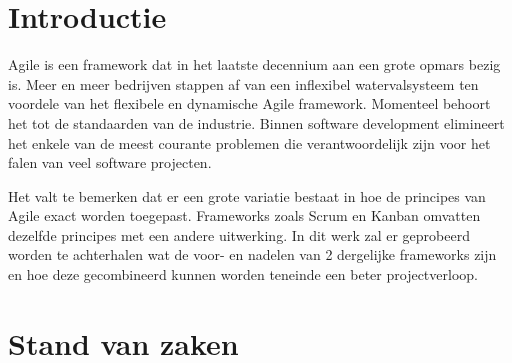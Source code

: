 
\section{Introductie} %
\label{sec:introductie}

%


Agile is een framework dat in het laatste decennium aan een grote opmars bezig is. Meer en meer bedrijven stappen af van een inflexibel watervalsysteem ten voordele van het flexibele en dynamische Agile framework. Momenteel behoort het tot de standaarden van de industrie. Binnen software development elimineert het enkele van de meest courante problemen die verantwoordelijk zijn voor het falen van veel software projecten.

Het valt te bemerken dat er een grote variatie bestaat in hoe de principes van Agile exact worden toegepast. Frameworks zoals Scrum en Kanban omvatten dezelfde principes met een andere uitwerking. In dit werk zal er geprobeerd worden te achterhalen wat de voor- en nadelen van 2 dergelijke frameworks zijn en hoe deze gecombineerd kunnen worden teneinde een beter projectverloop.


\section{Stand van zaken}
\label{sec:state-of-the-art}

